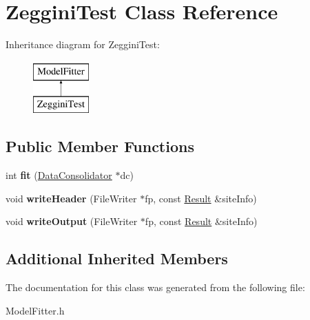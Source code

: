 \hypertarget{classZegginiTest}{\section{Zeggini\-Test Class Reference}
\label{classZegginiTest}
}
Inheritance diagram for Zeggini\-Test\-:\begin{figure}[H]
\begin{center}
\leavevmode
\includegraphics[height=2.000000cm]{classZegginiTest}
\end{center}
\end{figure}
\subsection*{Public Member Functions}
\begin{DoxyCompactItemize}
\item 
\hypertarget{classZegginiTest_abe558e2fc439c89b3ee6034b361ad8fe}{int {\bfseries fit} (\hyperlink{classDataConsolidator}{Data\-Consolidator} $\ast$dc)}\label{classZegginiTest_abe558e2fc439c89b3ee6034b361ad8fe}

\item 
\hypertarget{classZegginiTest_a47b8695cfc4b866c1d53611bb1f4a61f}{void {\bfseries write\-Header} (File\-Writer $\ast$fp, const \hyperlink{classResult}{Result} \&site\-Info)}\label{classZegginiTest_a47b8695cfc4b866c1d53611bb1f4a61f}

\item 
\hypertarget{classZegginiTest_aa2c9f4e741f4d4cfe91a652a8e2e277a}{void {\bfseries write\-Output} (File\-Writer $\ast$fp, const \hyperlink{classResult}{Result} \&site\-Info)}\label{classZegginiTest_aa2c9f4e741f4d4cfe91a652a8e2e277a}

\end{DoxyCompactItemize}
\subsection*{Additional Inherited Members}


The documentation for this class was generated from the following file\-:\begin{DoxyCompactItemize}
\item 
Model\-Fitter.\-h\end{DoxyCompactItemize}
